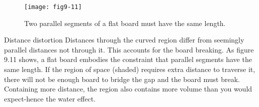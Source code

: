 \documentclass{book}
\begin{document}
\begin{figure}
\begin{center}
\texttt{[image: fig9-11]}
\caption{Two parallel segments of a flat board must have the same length.}
\end{center}
\end{figure}

Distance distortion Distances through the curved region differ from seemingly parallel distances not through it. This accounts for the board
breaking. As figure 9.11 shows, a flat board embodies the constraint that
parallel segments have the same length. If the region of space (shaded)
requires extra distance to traverse it, there will not be enough board to
bridge the gap and the board must break. Containing more distance,
the region also contains more volume than you would expect-hence the
water effect.
\end{document}

